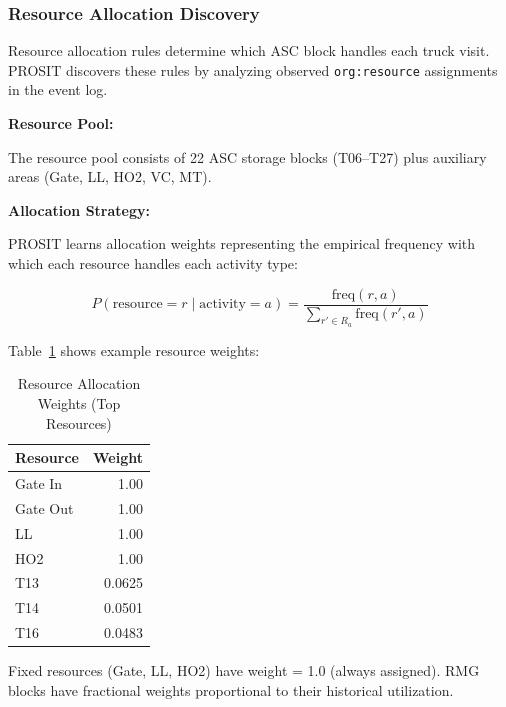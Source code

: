         \subsubsection{Resource Allocation Discovery}
        
        Resource allocation rules determine which ASC block handles each truck visit. PROSIT discovers these rules by analyzing observed \texttt{org:resource} assignments in the event log.
        
        \textbf{Resource Pool:}
        
        The resource pool consists of 22 ASC storage blocks (T06--T27) plus auxiliary areas (Gate, LL, HO2, VC, MT).
        
        \textbf{Allocation Strategy:}
        
        PROSIT learns allocation weights representing the empirical frequency with which each resource handles each activity type:
        
        \begin{equation}
        P(\text{resource} = r \mid \text{activity} = a) = \frac{\text{freq}(r, a)}{\sum_{r' \in R_a} \text{freq}(r', a)}
        \end{equation}
        
        Table~\ref{tab:resource_weights} shows example resource weights:
        
        \begin{table}[h]
        \centering
        \caption{Resource Allocation Weights (Top Resources)}
        \label{tab:resource_weights}
        \begin{tabular}{lr}
        \toprule
        \textbf{Resource} & \textbf{Weight} \\
        \midrule
        Gate In  & 1.00 \\
        Gate Out & 1.00 \\
        LL       & 1.00 \\
        HO2      & 1.00 \\
        T13      & 0.0625 \\
        T14      & 0.0501 \\
        T16      & 0.0483 \\
        \bottomrule
        \end{tabular}
        \end{table}
        
        Fixed resources (Gate, LL, HO2) have weight = 1.0 (always assigned). RMG blocks have fractional weights proportional to their historical utilization.

